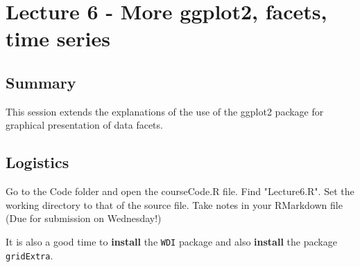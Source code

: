 \documentclass[titlepage]{book}\usepackage{knitr}
\begin{document}












\chapter{Lecture 6 - More ggplot2, facets, time series}\label{Lecture6}


\author{Brian Williams $<$\href{mailto:bjw649@gmail.com}%
{bjw649@gmail.com}$>$}


\section{Summary}
This session extends the explanations of the use of the ggplot2 package for graphical presentation of data facets.

\section{Logistics}
Go to the Code folder and open the courseCode.R file.  Find "Lecture6.R".
Set the working directory to that of the source file.  Take notes in your RMarkdown file (Due for submission on Wednesday!)

It is also a good time to \textbf{install} the \texttt{WDI} package and also \textbf{install} the package \texttt{gridExtra}.


\begin{knitrout}
\color{fgcolor}
\end{knitrout}
\end{document}
